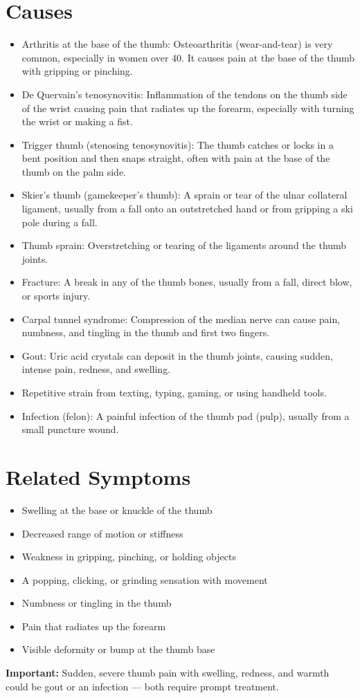 \section*{Causes}
\begin{itemize}
  \item Arthritis at the base of the thumb: Osteoarthritis (wear-and-tear) is very common, especially in women over 40. It causes pain at the base of the thumb with gripping or pinching.
  \item De Quervain's tenosynovitis: Inflammation of the tendons on the thumb side of the wrist causing pain that radiates up the forearm, especially with turning the wrist or making a fist.
  \item Trigger thumb (stenosing tenosynovitis): The thumb catches or locks in a bent position and then snaps straight, often with pain at the base of the thumb on the palm side.
  \item Skier's thumb (gamekeeper's thumb): A sprain or tear of the ulnar collateral ligament, usually from a fall onto an outstretched hand or from gripping a ski pole during a fall.
  \item Thumb sprain: Overstretching or tearing of the ligaments around the thumb joints.
  \item Fracture: A break in any of the thumb bones, usually from a fall, direct blow, or sports injury.
  \item Carpal tunnel syndrome: Compression of the median nerve can cause pain, numbness, and tingling in the thumb and first two fingers.
  \item Gout: Uric acid crystals can deposit in the thumb joints, causing sudden, intense pain, redness, and swelling.
  \item Repetitive strain from texting, typing, gaming, or using handheld tools.
  \item Infection (felon): A painful infection of the thumb pad (pulp), usually from a small puncture wound.
\end{itemize}

\section*{Related Symptoms}
\begin{itemize}
  \item Swelling at the base or knuckle of the thumb
  \item Decreased range of motion or stiffness
  \item Weakness in gripping, pinching, or holding objects
  \item A popping, clicking, or grinding sensation with movement
  \item Numbness or tingling in the thumb
  \item Pain that radiates up the forearm
  \item Visible deformity or bump at the thumb base
\end{itemize}
\textbf{Important:} Sudden, severe thumb pain with swelling, redness, and warmth could be gout or an infection — both require prompt treatment.

